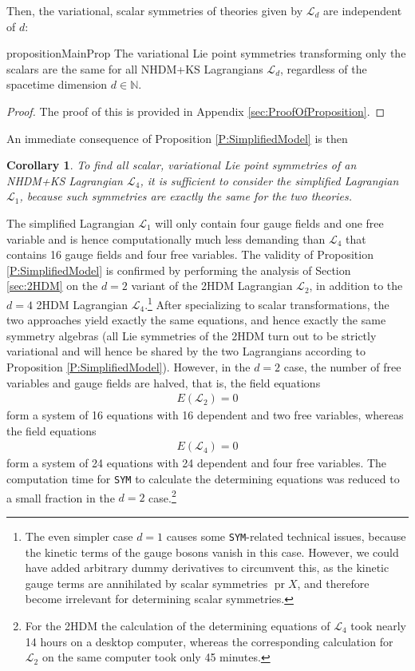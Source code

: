 \documentclass[a4paper,hidelinks, 12pt]{article}
\numberwithin{equation}{section}
\newtheorem{corollary}{Corollary}
\theoremstyle{plain}
\newcommand{\N}[1]{\mathbb{#1}}
\newcommand{\mc}{\mathcal}
\newcommand{\on}{\operatorname}
\begin{document}
Then, the variational, scalar symmetries of theories given by $\mc{L}_d$ are independent of $d$: 
\begin{restatable}{proposition}{MainProp}\label{P:SimplifiedModel}
  The variational Lie point symmetries transforming only the scalars are the same for all NHDM+KS Lagrangians $\mc{L}_d$, regardless of the spacetime dimension $d\in \N{N}$.    
\end{restatable}
\begin{proof}
The proof of this is provided in Appendix \ref{sec:ProofOfProposition}.
\end{proof}
An immediate consequence of Proposition \ref{P:SimplifiedModel}
is then
\begin{corollary}\label{C:1d4dcorr}
To find all scalar, variational Lie point symmetries of an NHDM+KS Lagrangian $\mc{L}_4$, it is sufficient to consider the simplified Lagrangian $\mc{L}_1$, because such symmetries are exactly the same for the two theories.
\end{corollary}
The simplified Lagrangian $\mc{L}_1$ will only contain four gauge fields and one free variable and is hence computationally much less demanding than $\mc{L}_4$ that contains 16 gauge fields and four free variables.
The validity of Proposition \ref{P:SimplifiedModel} is confirmed by performing the analysis of Section \ref{sec:2HDM} on the $d=2$ variant 
of the 2HDM Lagrangian $\mc{L}_2$, in addition to the $d=4$
2HDM Lagrangian $\mc{L}_4$.\footnote{The even simpler case $d=1$ causes some \texttt{SYM}-related technical issues, because the kinetic terms of the gauge bosons vanish in this case. However, we could have added arbitrary dummy derivatives to circumvent this, as the kinetic gauge terms are annihilated by scalar symmetries $\on{pr}X$, and therefore become irrelevant for determining scalar symmetries.} After specializing to scalar transformations, the two approaches yield exactly the same equations, and hence exactly the same symmetry algebras (all Lie symmetries of the 2HDM turn out to be strictly variational and will hence be shared by the two Lagrangians according to Proposition \ref{P:SimplifiedModel}). However, in the $d=2$ case, the number of free variables and gauge fields are halved, that is, the field equations
\begin{align}
E(\mc{L}_2)=0	
\end{align}
form a system of 16 equations with 16 dependent and two free variables, whereas the field equations
\begin{align}
	E(\mc{L}_4)=0
\end{align}
form a system of 24 equations with 24 dependent and four free variables. The computation time for \texttt{SYM} to calculate the determining equations was reduced to a small fraction in the $d=2$ case.\footnote{For the 2HDM the calculation of the determining equations of $\mc{L}_4$ took nearly 14 hours on a desktop computer, whereas the corresponding calculation for $\mc{L}_2$ on the same computer took only 45 minutes.} 
\end{document}
